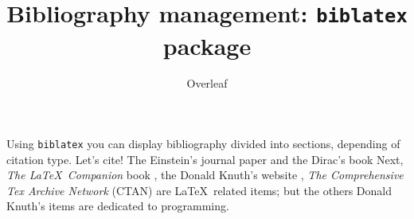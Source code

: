 \documentclass{report}
\title{Bibliography management: \texttt{biblatex} package}
\author{Overleaf}
\date{ }
\begin{document}
	
	\maketitle
	
	Using \texttt{biblatex} you can display bibliography divided into sections, 
	depending of citation type. 
	Let's cite! The Einstein's journal paper \cite{einstein} and the Dirac's 
	book %
	Next, \textit{The \LaTeX\ Companion} book \cite{latexcompanion}, the Donald 
	Knuth's website \cite{knuthwebsite}, \textit{The Comprehensive Tex Archive 
		Network} (CTAN) \cite{ctan} are \LaTeX\ related items; but the others Donald 
	Knuth's items \cite{knuth-fa,knuth-acp} are dedicated to programming. 
	
	\medskip
	
	\printbibliography[title={Whole bibliography}]
	
	
	\printbibliography[type=article,title={Articles only}]
	\printbibliography[type=book,title={Books only}]
	
	\printbibliography[keyword={physics},title={Physics-related only}]
	\printbibliography[keyword={latex},title={\LaTeX-related only}]
	
	
\end{document}
